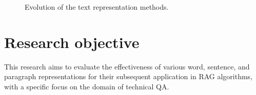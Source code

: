 \begin{figure}
  \centering
    
  \caption{Evolution of the text representation methods.}
  \label{fig:ecolution_text_representation}
\end{figure}

\section{Research objective}

This research aims to evaluate the effectiveness of various word, sentence, and paragraph representations for their subsequent application in \ac{RAG} algorithms, with a specific focus on the domain of technical \ac{QA}.